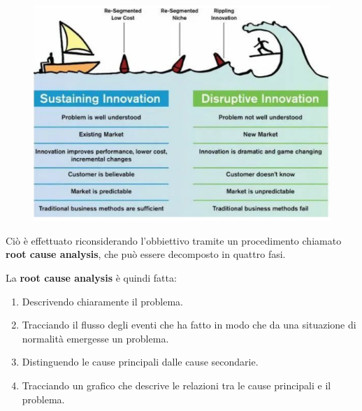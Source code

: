 \documentclass[a4paper,11pt,oneside]{book}
\begin{document}
\begin{figure}[!h]
	\centering
	\includegraphics[scale=0.8]{"immagini/Disruptive Innovation"}
\end{figure}

Ciò è effettuato riconsiderando l'obbiettivo tramite un procedimento chiamato \textbf{root cause analysis}, che può essere decomposto in quattro fasi.

La \textbf{root cause analysis} è quindi fatta:

\begin{enumerate}
	\item Descrivendo chiaramente il problema.
	\item Tracciando il flusso degli eventi che ha fatto in modo che da una situazione di normalità emergesse un problema.
	\item Distinguendo le cause principali dalle cause secondarie.
	\item Tracciando un grafico che descrive le relazioni tra le cause principali e il problema.
\end{enumerate}
\end{document}
